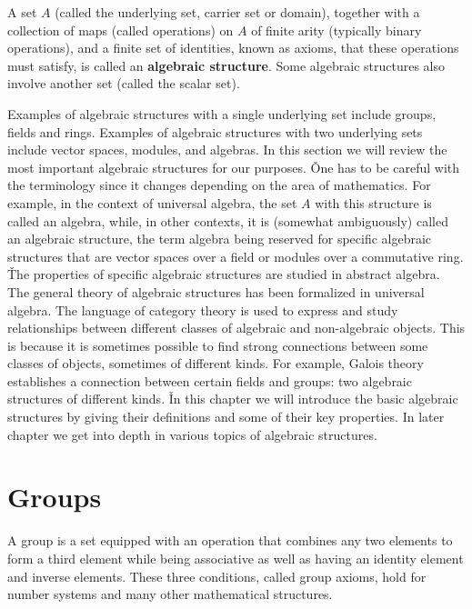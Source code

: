 A set $A$ (called the underlying set, carrier set or domain), together with a collection of maps (called operations)
on $A$ of finite arity (typically binary operations), and a finite set of identities, known as axioms, that these
operations must satisfy, is called an \textbf{algebraic structure}. Some algebraic structures also involve another
set (called the scalar set). \ed

Examples of algebraic structures with a single underlying set include groups, fields and rings. Examples of algebraic
structures with two underlying sets include vector spaces, modules, and algebras. In this section we will review the
most important algebraic structures for our purposes. \v

One has to be careful with the terminology since it changes depending on the area of mathematics. For example, in the
context of universal algebra, the set $A$ with this structure is called an algebra, while, in other contexts, it is
(somewhat ambiguously) called an algebraic structure, the term algebra being reserved for specific algebraic
structures that are vector spaces over a field or modules over a commutative ring. \v

The properties of specific algebraic structures are studied in abstract algebra. The general theory of algebraic
structures has been formalized in universal algebra. The language of category theory is used to express and study
relationships between different classes of algebraic and non-algebraic objects. This is because it is sometimes
possible to find strong connections between some classes of objects, sometimes of different kinds. For example,
Galois theory establishes a connection between certain fields and groups: two algebraic structures of different kinds. \v

In this chapter we will introduce the basic algebraic structures by giving their definitions and some of their key
properties. In later chapter we get into depth in various topics of algebraic structures.

\section{Groups}

A group is a set equipped with an operation that combines any two elements to form a third element while being
associative as well as having an identity element and inverse elements. These three conditions, called group axioms,
hold for number systems and many other mathematical structures.

